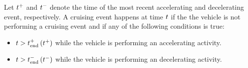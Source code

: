 Let $t^{+}$ and $t^{-}$ denote the time of the most recent accelerating and decelerating event, respectively. A cruising event happens at time $t$ if the the vehicle is not performing a cruising event and if any of the following conditions is true:
\begin{itemize}
	\item $t > t_{\mathrm{end}}^{+}\left(t^{+}\right)$ while the vehicle is performing an accelerating activity.
	\item $t > t_{\mathrm{end}}^{-}\left(t^{-}\right)$ while the vehicle is performing an decelerating activity.
\end{itemize}